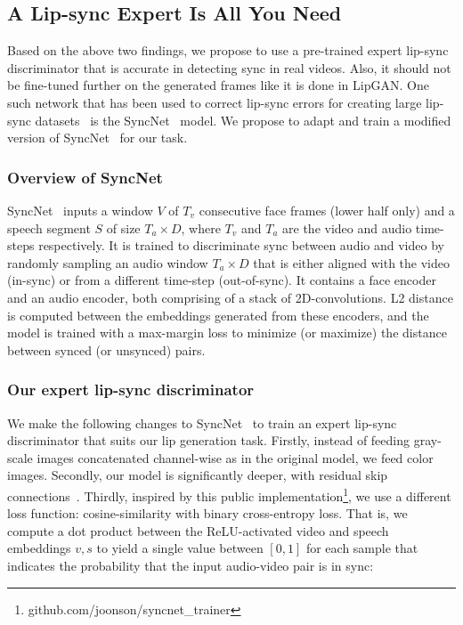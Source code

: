 \documentclass[sigconf]{acmart}
\begin{document}
\subsection{A Lip-sync Expert Is All You Need}
\label{subsection:syncnet}
Based on the above two findings, we propose to use a pre-trained expert lip-sync discriminator that is accurate in detecting sync in real videos. Also, it should not be fine-tuned further on the generated frames like it is done in LipGAN. One such network that has been used to correct lip-sync errors for creating large lip-sync datasets~\cite{Afouras18c,afouras2018lrs3} is the SyncNet~\cite{Chung16a} model. We propose to adapt and train a modified version of SyncNet~\cite{Chung16a} for our task. 

\subsubsection{Overview of SyncNet} SyncNet~\cite{Chung16a} inputs a window $V$ of $T_v$ consecutive face frames (lower half only) and a speech segment $S$ of size $T_a \times D$, where $T_v$ and $T_a$ are the video and audio time-steps respectively. It is trained to discriminate sync between audio and video by randomly sampling an audio window $T_a \times D$ that is either aligned with the video (in-sync) or from a different time-step (out-of-sync). It contains a face encoder and an audio encoder, both comprising of a stack of 2D-convolutions. L2 distance is computed between the embeddings generated from these encoders, and the model is trained with a max-margin loss to minimize (or maximize) the distance between synced (or unsynced) pairs. 

\subsubsection{Our expert lip-sync discriminator} We make the following changes to SyncNet~\cite{Chung16a} to train an expert lip-sync discriminator that suits our lip generation task. Firstly, instead of feeding gray-scale images concatenated channel-wise as in the original model, we feed color images. Secondly, our model is significantly deeper, with residual skip connections~\cite{he2016deep}. Thirdly, inspired by this public implementation\footnote{github.com/joonson/syncnet\_trainer}, we use a different loss function: cosine-similarity with binary cross-entropy loss. That is, we compute a dot product between the ReLU-activated video and speech embeddings $v, s$ to yield a single value between $[0, 1]$ for each sample that indicates the probability that the input audio-video pair is in sync: 
\end{document}
